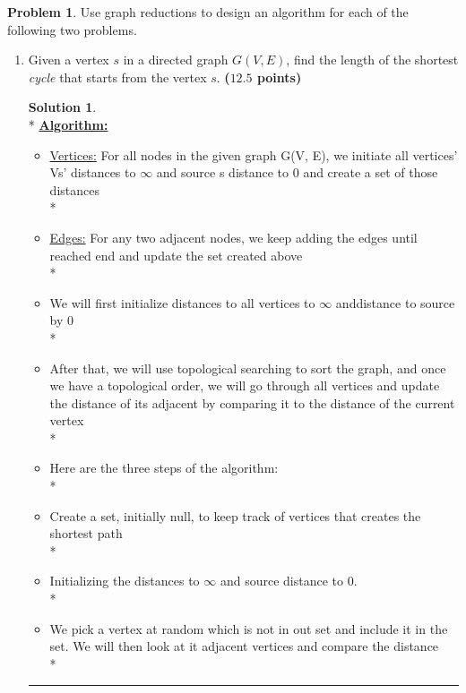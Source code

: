 \documentclass{article}
\theoremstyle{definition}
\newtheorem{problem}{Problem}
\def\fline{\rule{0.75\linewidth}{0.5pt}}
\newcommand{\finishline}{\vspace{-15pt}\begin{center}\fline\end{center}}
\newtheorem*{solution*}{Solution}
\newenvironment{solution}{\begin{solution*}}{{\finishline} \end{solution*}}
\newcommand{\grade}[1]{\hfill{\textbf{($\mathbf{#1}$ points)}}}
\begin{document}
\begin{problem}
	Use graph reductions to design an algorithm for each of the following two problems. 
	\begin{enumerate}[label=(\alph*)]
		\item Given a vertex $s$ in a directed graph $G(V,E)$, find the length of the shortest \emph{cycle} that starts from the vertex $s$. \grade{12.5} 
		\smallskip
			\begin{solution}
				\hfill \bigskip\\*
				\textbf{\underline{Algorithm:}} 
					\begin{itemize}
						\item{\underline{Vertices:}}  For all nodes  in the given graph G(V, E), we initiate all vertices' Vs' distances to $\infty$ and source s distance to 0 and create a set of those distances \\*
						\item{\underline{Edges:}} For any two adjacent nodes, we keep adding the edges until reached end and update the set created above \\*
						\item We will first initialize distances to all vertices to $\infty$ anddistance to source by 0 \\*
						\item  After that, we will use topological searching to sort the graph, and once we have a topological order, we will go through all vertices and update the distance of its adjacent by comparing it to the distance of the current vertex\\*
						\item Here are the three steps of the algorithm: \\*
						\item[1.] Create a set, initially null, to keep track of vertices that creates the shortest path \\*
						\item[2.] Initializing the distances to $\infty$ and source distance to 0. \\*
						\item[3.] We pick a vertex at random which is not in out set and include it in the set. We will then look at it adjacent vertices and compare the distance \\*
					\end{itemize} 				


\end{solution}
\end{enumerate}
\end{problem}
\end{document}

